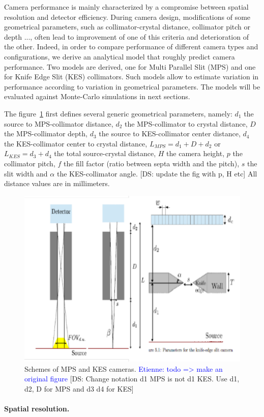 \documentclass[a4paper,english]{article}
\newcommand{\tcb}[1]{\textcolor{blue}{#1}}
\newcommand\ds[1]{\color{orange}[DS: #1]\color{black}}
\begin{document}
Camera performance is mainly characterized by a compromise between spatial
resolution and detector efficiency. During camera design, modifications of some
geometrical parameters, such as collimator-crystal distance, collimator pitch or
depth ..., often lead to improvement of one of this criteria and deterioration
of the other. Indeed, in order to compare performance of different camera types
and configurations, we derive an analytical model that roughly predict camera
performance. Two models are derived, one for Multi Parallel Slit (MPS) and one
for Knife Edge Slit (KES) collimators. Such models allow to estimate variation
in performance according to variation in geometrical parameters. The models will
be evaluated against Monte-Carlo simulations in next sections. 

The figure~\ref{fig:GeomSchemes} first defines several generic geometrical
parameters, namely: $d_1$ the source to MPS-collimator distance, $d_2$ the
MPS-collimator to crystal distance, $D$ the MPS-collimator depth, $d_3$ the
source to KES-collimator center distance, $d_4$ the KES-collimator center to
crystal distance, $L_{MPS}=d_1+D+d_2$ or $L_{KES}=d_3+d_4$ the total
source-crystal distance, $H$ the camera height, $p$ the collimator pitch, $f$
the fill factor (ratio between septa width and the pitch), $s$ the slit width
and $\alpha$ the KES-collimator angle. \ds{update the fig with p, H etc} All
distance values are in millimeters.

\begin{figure}[htbp]
    \centering
    \includegraphics[width=.45\textwidth]{SchemeMPS-KES}
    \caption{Schemes of MPS and KES cameras. \tcb{Etienne: todo => make an
        original figure} \ds{Change notation d1 MPS is not d1 KES. Use d1, d2, D
        for MPS and d3 d4 for KES}}
    \label{fig:GeomSchemes}
\end{figure}          

\paragraph{Spatial resolution.}
\end{document}
